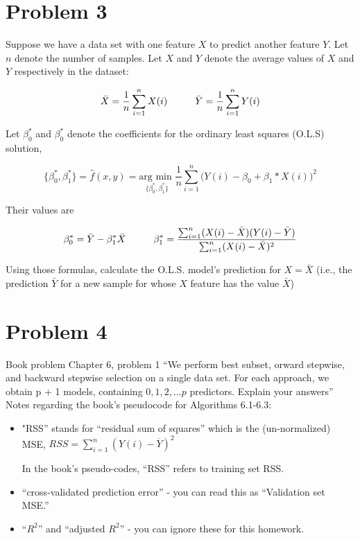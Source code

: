 \documentclass[12pt]{article}
\newcommand\tab[1][1cm]{\hspace*{#1}}
\begin{document}
\pagebreak
\section*{Problem 3}
Suppose we have a data set with one feature $X$ to predict another feature $Y$. Let $n$ denote the number of samples. Let $X$ and $Y$ denote the average values of $X$ and $Y$ respectively in the dataset:

\begin{center}
    \[
        \bar{X} = \frac{1}{n}\sum_{i = 1}^{n}X(i)
        \tab
        \bar{Y} = \frac{1}{n}\sum_{i = 1}^{n}Y(i)
    \]
\end{center}

Let $\beta_{0}^{*}$ and $\beta_{0}^{*}$ denote the coefficients for the ordinary least squares (O.L.S) solution,

\begin{center}
    \[
        \{\beta_{0}^{*}, \beta_{1}^{*}\} = \hat{f}(x,y) = \underset{\{\beta_{0}^{*}, \beta_{1}^{*}\}}{\text{arg min }}\frac{1}{n}\sum_{i = 1}^{n} \bigg( Y(i) - \beta_0 + \beta_1*X(i) \bigg) ^2
    \]
\end{center}

Their values are

\begin{center}
    \[
        \beta_{0}^{*} = \bar{Y} - \beta_{1}^{*}\bar{X}
        \tab
        \beta_{1}^{*} = \frac{\sum_{i = 1}^{n}(X(i) - \bar{X})(Y(i)-\bar{Y})}{\sum_{i = 1}^{n}(X(i)-\bar{X})^2}
    \]
\end{center}

Using those formulas, calculate the O.L.S. model's prediction for $ X = \bar{X}$ (i.e., the prediction $\bar{Y}$ for a new sample for whose $X$ feature has the value $\bar{X}$)

\pagebreak
\section*{Problem 4}
Book problem Chapter 6, problem 1 “We perform best subset, orward stepwise, and backward stepwise selection on a single data set. For each approach, we obtain p + 1 models, containing $0, 1, 2, ... p$ predictors.  Explain your answers” \newline
Notes regarding the book's pseudocode for Algorithms 6.1-6.3:

\begin{itemize}
    \item "RSS” stands for “residual sum of squares” which is the (un-normalized) MSE,\newline
          $RSS = \sum_{i = 1}^{n} ( Y(i) - \overline{Y} )^{2}$

          \medspace

          In the book's pseudo-codes, “RSS” refers to training set RSS.

    \item “cross-validated prediction error” - you can read this as “Validation set MSE.”
    \item “$R^2$” and “adjusted $R^2$” - you can ignore these for this homework.
\end{itemize}
\end{document}
